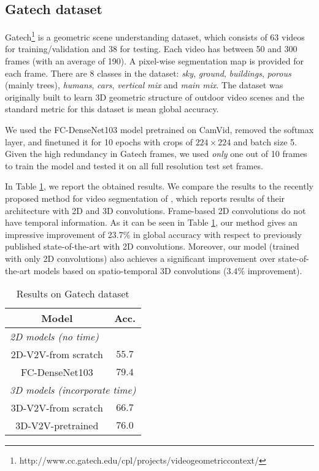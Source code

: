 \documentclass[10pt,twocolumn,letterpaper]{article}
\begin{document}
\subsection{Gatech dataset} 
Gatech\footnote{http://www.cc.gatech.edu/cpl/projects/videogeometriccontext/} \cite{VideoGeometricContext2013} is a geometric scene understanding dataset, which consists of 63 videos for training/validation and 38 for testing. Each video has between 50 and 300 frames (with an average of 190). A pixel-wise segmentation map is provided for each frame. There are 8 classes in the dataset: \textit{sky}, \textit{ground}, \textit{buildings}, \textit{porous} (mainly trees), \textit{humans}, \textit{cars}, \textit{vertical mix} and \textit{main mix}. The dataset was originally built to learn 3D geometric structure of outdoor video scenes and the standard metric for this dataset is mean global accuracy.

We used the FC-DenseNet103 model pretrained on CamVid, removed the softmax layer, and finetuned it for 10 epochs with crops of $224 \times 224$ and batch size 5. Given the high redundancy in Gatech frames, we used \emph{only} one out of 10 frames to train the model and tested it on all full resolution test set frames. 

In Table \ref{tab:GATECH}, we report the obtained results. We compare the results to the recently proposed method for video segmentation of \cite{Tran16v2v}, which reports results of their architecture with 2D and 3D convolutions. Frame-based 2D convolutions do not have temporal information. As it can be seen in Table \ref{tab:GATECH}, our method gives an impressive improvement of 23.7\% in global accuracy with respect to previously published state-of-the-art with 2D convolutions. Moreover, our model (trained with only 2D convolutions) also achieves a significant improvement over state-of-the-art models based on spatio-temporal 3D convolutions ($3.4\%$ improvement). 


\begin{table}
\centering
 \begin{tabular}{c || c }
 Model & Acc. \\
 \hline \hline
 \multicolumn{2}{l}{\emph{2D models (no time)}} \\
 \hline 
 2D-V2V-from scratch \cite{Tran16v2v} & $55.7$\\ \hline
  FC-DenseNet103 & $\mathbf{79.4}$\\ 
 \hline 
 \hline
 \multicolumn{2}{l}{\emph{3D models (incorporate time)}} \\
 \hline
 3D-V2V-from scratch \cite{Tran16v2v} & $66.7$\\
 \hline
 3D-V2V-pretrained \cite{Tran16v2v} & $76.0$\\
 \hline

 \end{tabular}
 \vspace{0.2cm}
 \caption{Results on Gatech dataset}
 \label{tab:GATECH}
\end{table}
\end{document}
